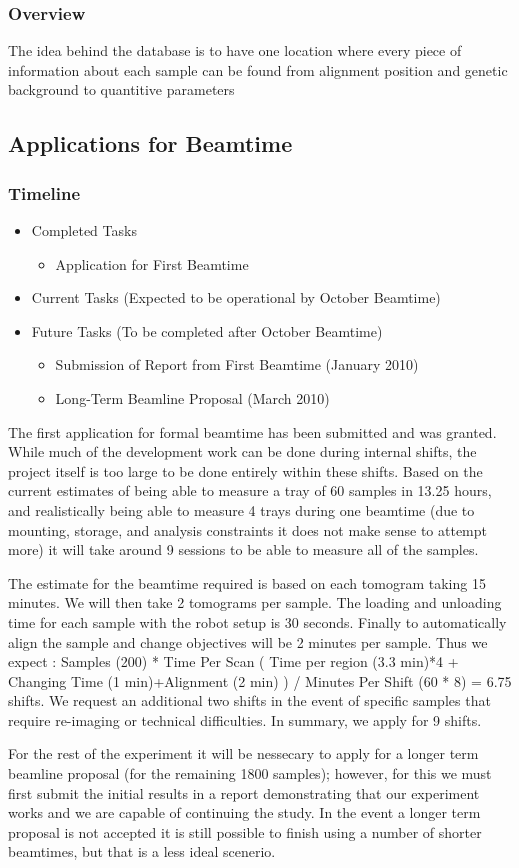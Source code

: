 \subsubsection*{Overview}
The idea behind the database is to have one location where every piece of information about each sample can be found from alignment position and genetic background to quantitive parameters

\subsection{Applications for Beamtime}
\subsubsection*{Timeline}
\begin{itemize}
 	\item Completed Tasks
	\begin{itemize}
		\item Application for First Beamtime
	\end{itemize}
	\item Current Tasks (Expected to be operational by October Beamtime)
	\item Future Tasks (To be completed after October Beamtime)
	\begin{itemize}
		\item Submission of Report from First Beamtime (January 2010)
		\item Long-Term Beamline Proposal (March 2010)
	\end{itemize}
\end{itemize}
The first application for formal beamtime has been submitted and was granted. While much of the development work can be done during internal shifts, the project itself is too large to be done entirely within these shifts. Based on the current estimates of being able to measure a tray of 60 samples in 13.25 hours, and realistically being able to measure 4 trays during one beamtime (due to mounting, storage, and analysis constraints it does not make sense to attempt more) it will take around 9 sessions to be able to measure all of the samples.

The estimate for the beamtime required is based on each tomogram taking 15 minutes. We will then take 2 tomograms per sample. The loading and unloading time for each sample with the robot setup is 30 seconds. Finally to automatically align the sample and change objectives will be 2 minutes per sample. Thus we expect : Samples (200) * Time Per Scan ( Time per region (3.3 min)*4 + Changing Time (1 min)+Alignment (2 min) ) / Minutes Per Shift (60 * 8) = 6.75 shifts. We request an additional two shifts in the event of specific samples that require re-imaging or technical difficulties. In summary, we apply for 9 shifts.

For the rest of the experiment it will be nessecary to apply for a longer term beamline proposal (for the remaining 1800 samples); however, for this we must first submit the initial results in a report demonstrating that our experiment works and we are capable of continuing the study. In the event a longer term proposal is not accepted it is still possible to finish using a number of shorter beamtimes, but that is a less ideal scenerio.
